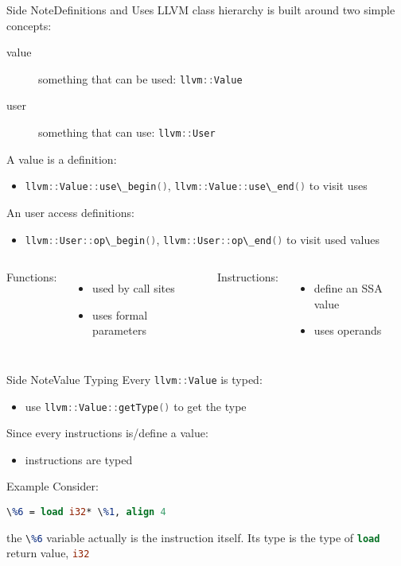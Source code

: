 \documentclass[10pt,mathserif]{beamer}
\newcommand{\cppinline}[1]{\lstinline[language=C++]!#1!}
\newcommand{\llvminline}[1]{\lstinline[language=LLVM]!#1!}
\begin{document}
\begin{frame}{Side Note}{Definitions and Uses}
LLVM class hierarchy is built around two simple concepts:

\begin{description}
\item[value] something that can be used: \cppinline{llvm::Value}
\item[user] something that can use: \cppinline{llvm::User}
\end{description}

A value is a \alert{definition}:

\begin{itemize}
\item \cppinline{llvm::Value::use\_begin()},
      \cppinline{llvm::Value::use\_end()} to visit uses
\end{itemize}

An user access \alert{definitions}:

\begin{itemize}
\item \cppinline{llvm::User::op\_begin()},
      \cppinline{llvm::User::op\_end()} to visit used values
\end{itemize}

\begin{columns}[t]
Functions:

\begin{itemize}
\item used by call sites
\item uses formal parameters
\end{itemize}

Instructions:

\begin{itemize}
\item define an SSA value
\item uses operands
\end{itemize}
\end{columns}
\end{frame}

\begin{frame}{Side Note}{Value Typing}
Every \cppinline{llvm::Value} is typed:

\begin{itemize}
\item use \cppinline{llvm::Value::getType()} to get the type
\end{itemize}

Since every instructions is/define a value:

\begin{itemize}
\item instructions are typed
\end{itemize}

\begin{block}{Example}
Consider:

\centering
\llvminline{\%6 = load i32* \%1, align 4}

\flushleft
the \llvminline{\%6} variable actually is the instruction itself. Its type is
the type of \llvminline{load} return value, \llvminline{i32}
\end{block}
\end{frame}
\end{document}
